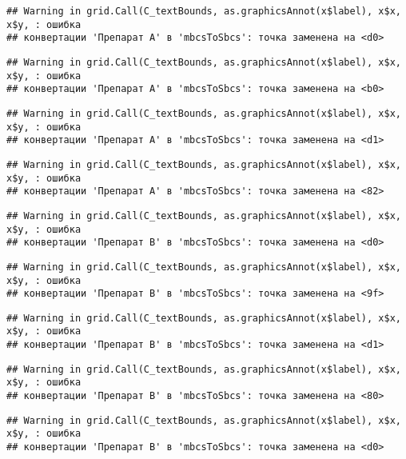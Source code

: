 \documentclass[
]{article}
\begin{document}
\begin{verbatim}
## Warning in grid.Call(C_textBounds, as.graphicsAnnot(x$label), x$x, x$y, : ошибка
## конвертации 'Препарат A' в 'mbcsToSbcs': точка заменена на <d0>
\end{verbatim}

\begin{verbatim}
## Warning in grid.Call(C_textBounds, as.graphicsAnnot(x$label), x$x, x$y, : ошибка
## конвертации 'Препарат A' в 'mbcsToSbcs': точка заменена на <b0>
\end{verbatim}

\begin{verbatim}
## Warning in grid.Call(C_textBounds, as.graphicsAnnot(x$label), x$x, x$y, : ошибка
## конвертации 'Препарат A' в 'mbcsToSbcs': точка заменена на <d1>
\end{verbatim}

\begin{verbatim}
## Warning in grid.Call(C_textBounds, as.graphicsAnnot(x$label), x$x, x$y, : ошибка
## конвертации 'Препарат A' в 'mbcsToSbcs': точка заменена на <82>
\end{verbatim}

\begin{verbatim}
## Warning in grid.Call(C_textBounds, as.graphicsAnnot(x$label), x$x, x$y, : ошибка
## конвертации 'Препарат B' в 'mbcsToSbcs': точка заменена на <d0>
\end{verbatim}

\begin{verbatim}
## Warning in grid.Call(C_textBounds, as.graphicsAnnot(x$label), x$x, x$y, : ошибка
## конвертации 'Препарат B' в 'mbcsToSbcs': точка заменена на <9f>
\end{verbatim}

\begin{verbatim}
## Warning in grid.Call(C_textBounds, as.graphicsAnnot(x$label), x$x, x$y, : ошибка
## конвертации 'Препарат B' в 'mbcsToSbcs': точка заменена на <d1>
\end{verbatim}

\begin{verbatim}
## Warning in grid.Call(C_textBounds, as.graphicsAnnot(x$label), x$x, x$y, : ошибка
## конвертации 'Препарат B' в 'mbcsToSbcs': точка заменена на <80>
\end{verbatim}

\begin{verbatim}
## Warning in grid.Call(C_textBounds, as.graphicsAnnot(x$label), x$x, x$y, : ошибка
## конвертации 'Препарат B' в 'mbcsToSbcs': точка заменена на <d0>
\end{verbatim}
\end{document}

